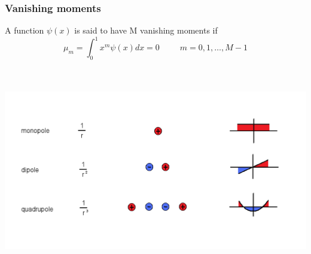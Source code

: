 \documentclass[mathserif]{beamer}
\begin{document}
\begin{frame}
    \frametitle{Vanishing moments}
    A function $\psi(x)$ is said to have M vanishing moments if
    \begin{equation}
	\nonumber
        \mu_m = \int_0^1 x^m\psi(x) dx = 0 \ \ \ \ \ \ \ \ \ \ \ m = 0,1,\dots,M-1 
    \end{equation}
    \ \\
    \ \\
    \begin{center}
	\includegraphics[scale=0.4, clip, viewport = 0 50 700 350]{figures/multipoles.pdf}
    \end{center}
\end{frame}
\end{document}
